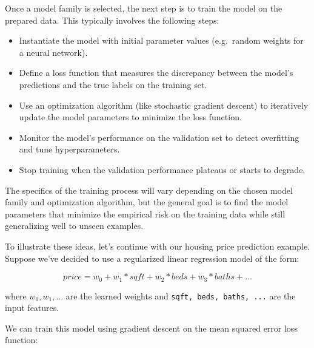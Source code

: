 \documentclass[
  9pt,
  letterpaper,
  abstract,
  titlepage]{scrbook}
\begin{document}
Once a model family is selected, the next step is to train the model on
the prepared data. This typically involves the following steps:

\begin{itemize}
\item
  Instantiate the model with initial parameter values (e.g.~random
  weights for a neural network).
\item
  Define a loss function that measures the discrepancy between the
  model's predictions and the true labels on the training set.
\item
  Use an optimization algorithm (like stochastic gradient descent) to
  iteratively update the model parameters to minimize the loss function.
\item
  Monitor the model's performance on the validation set to detect
  overfitting and tune hyperparameters.
\item
  Stop training when the validation performance plateaus or starts to
  degrade.
\end{itemize}

The specifics of the training process will vary depending on the chosen
model family and optimization algorithm, but the general goal is to find
the model parameters that minimize the empirical risk on the training
data while still generalizing well to unseen examples.

To illustrate these ideas, let's continue with our housing price
prediction example. Suppose we've decided to use a regularized linear
regression model of the form:

\[price = w_0 + w_1 * sqft + w_2 * beds + w_3 * baths + ...\]

where \(w_0, w_1, ...\) are the learned weights and
\texttt{sqft,\ beds,\ baths,\ ...} are the input features.

We can train this model using gradient descent on the mean squared error
loss function:
\end{document}
